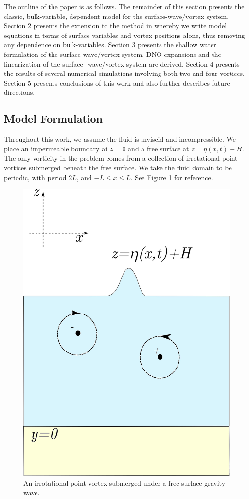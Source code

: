 \documentclass[a4paper,11pt]{article}
\begin{document}
The outline of the paper is as follows.  The remainder of this section presents the classic, bulk-variable, dependent model for the surface-wave/vortex system.  Section 2 presents the extension to the method in \cite{afm} whereby we write model equations in terms of surface variables and vortex positions alone, thus removing any dependence on bulk-variables.  Section 3 presents the shallow water formulation of the surface-wave/vortex system.  DNO expansions and the linearization of the surface -wave/vortex system are derived.  Section 4 presents the results of several numerical simulations involving both two and four vortices.  Section 5 presents conclusions of this work and also further describes future directions.  
  
\subsection{Model Formulation}
Throughout this work, we assume the fluid is inviscid and incompressible.  We place an impermeable boundary at $z=0$ and a free surface at $z=\eta(x,t)+H$.  The only vorticity in the problem comes from a collection of irrotational point vortices submerged beneath the free surface.  We take the fluid domain to be periodic, with period $2L$, and $-L\leq x \leq L$.  See Figure \ref{fig:vortex} for reference.  
\begin{figure}
\centering
\includegraphics[width=.35\textwidth]{surface_vortex}
\caption{An irrotational point vortex submerged under a free surface gravity wave.}
\label{fig:vortex}
\end{figure}
\end{document}
